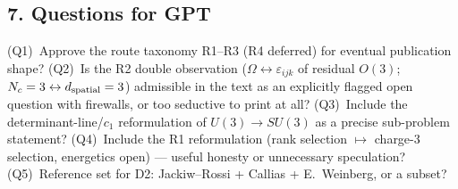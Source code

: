 \subsection*{7. Questions for GPT}
(Q1)~Approve the route taxonomy R1--R3 (R4 deferred) for eventual
publication shape?
(Q2)~Is the R2 double observation
($\Omega\leftrightarrow\varepsilon_{ijk}$ of residual $O(3)$;
$N_c=3\leftrightarrow d_{\rm spatial}=3$) admissible in the text
as an explicitly flagged open question with firewalls, or too
seductive to print at all?
(Q3)~Include the determinant-line/$c_1$ reformulation of
$U(3)\to SU(3)$ as a precise sub-problem statement?
(Q4)~Include the R1 reformulation (rank selection $\mapsto$
charge-3 selection, energetics open) --- useful honesty or
unnecessary speculation?
(Q5)~Reference set for D2: Jackiw--Rossi + Callias + E.~Weinberg,
or a subset?
